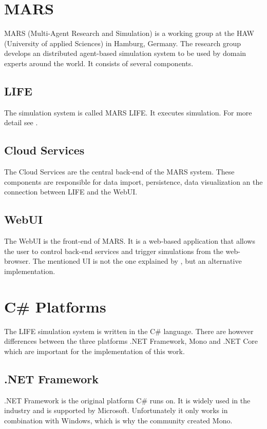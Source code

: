 \section{MARS}
MARS (Multi-Agent Research and Simulation) is a working group at the HAW (University of applied Sciences) in Hamburg, Germany. The research group develops an distributed agent-based simulation system \citep{Wooldridge2009} to be used by domain experts around the world. It consists of several components.


\subsection{LIFE}
The simulation system is called MARS LIFE. It executes simulation. For more detail see \cite{Huning2016}.


\subsection{Cloud Services}
The Cloud Services are the central back-end of the MARS system. These components are responsible for data import, persistence, data visualization an the connection between LIFE and the WebUI.


\subsection{WebUI}
The WebUI is the front-end of MARS. It is a web-based application that allows the user to control back-end services and trigger simulations from the web-browser. The mentioned UI is not the one explained by \cite{Karsten2017}, but an alternative implementation.



\section{C\# Platforms}
The LIFE simulation system is written in the C\# language. There are however differences between the three platforms .NET Framework, Mono and .NET Core which are important for the implementation of this work.


\subsection{.NET Framework}
.NET Framework is the original platform C\# runs on. It is widely used in the industry and is supported by Microsoft. Unfortunately it only works in combination with Windows, which is why the community created Mono.

